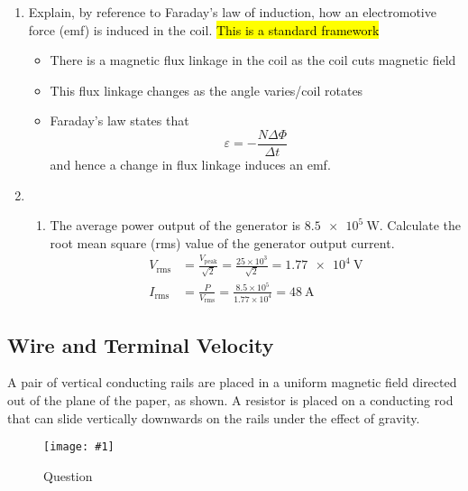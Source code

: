 \documentclass[a4paper,12pt]{article}
\newcommand{\img}[4]{\begin{center}
  \begin{figure}[H]
    \centering
    \texttt{[image: \#1]}
    \caption{#3}
    \label{fig:#4}
  \end{figure}
\end{center}}
\begin{document}
\begin{enumerate}[label=(\alph*)]
  \item Explain, by reference to Faraday's law of induction, how an electromotive force (emf) is induced in the coil. \hl{This is a standard framework}
        \begin{itemize}
          \item There is a magnetic flux linkage in the coil as the coil cuts magnetic field
          \item This flux linkage changes as the angle varies/coil rotates
          \item Faraday's law states that
                $$\varepsilon = -\frac{N\Delta \Phi}{\Delta t}$$
                and hence a change in flux linkage induces an emf.
        \end{itemize}
  \item \begin{enumerate}[label=(\roman*)]
          \item The average power output of the generator is $\SI{8.5e5}{\W}$. Calculate the root mean square (rms) value of the generator output current.
                \begin{align*}
                  V_\text{rms} & = \frac{V_\text{peak}}{\sqrt{2}} = \frac{25\times 10^3}{\sqrt{2}} = \SI{1.77e4}{\V} \\
                  I_\text{rms} & = \frac{P}{V_\text{rms}} = \frac{8.5\times 10^5}{1.77\times 10^4} = \SI{48}{\A}
                \end{align*}
        \end{enumerate}
\end{enumerate}


\pagebreak
\subsection{Wire and Terminal Velocity}

A pair of vertical conducting rails are placed in a uniform magnetic field directed out of the plane of the paper, as shown. A resistor is placed on a conducting rod that can slide vertically downwards on the rails under the effect of gravity.

\img{ex/15.png}{0.45}{Question}{wire}
\end{document}
